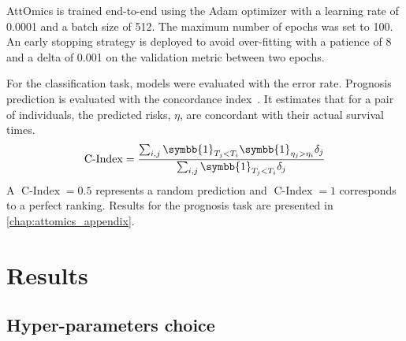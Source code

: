 \documentclass[../main.tex]{subfiles}
\begin{document}
	    AttOmics is trained end-to-end using the Adam optimizer with a learning rate of 0.0001 and a batch size of 512.
	    The maximum number of epochs was set to 100.
	    An early stopping strategy is deployed to avoid over-fitting with a patience of 8 and a delta of 0.001 on the validation metric between two epochs.

	    For the classification task, models were evaluated with the error rate.
	    Prognosis prediction is evaluated with the concordance index~\cite{harrellMultivariablePrognosticModels1996}.
	    It estimates that for a pair of individuals, the predicted risks, \(\eta\),  are concordant with their actual survival times.
	    \[ \operatorname{C-Index} = \frac{\sum_{i,j}\symbb{1}_{T_j < T_i}\symbb{1}_{\eta_j > \eta_i}\delta_j}{\sum_{i,j}\symbb{1}_{T_j < T_i}\delta_j} \]
	    A \(\operatorname{C-Index} = 0.5\) represents a random prediction and \(\operatorname{C-Index} = 1\) corresponds to a perfect ranking.
	    Results for the prognosis task are presented in \cref{chap:attomics_appendix}.

\section{Results}

	\subsection{Hyper-parameters choice}
\end{document}
